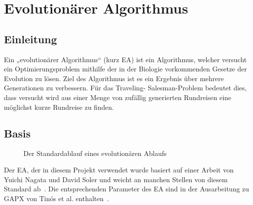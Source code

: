\chapter{Evolutionärer Algorithmus}
\section{Einleitung}
Ein „evolutionärer Algorithmus“ (kurz EA) ist ein Algorithmus, welcher 
versucht ein Optimierungsproblem mithilfe der in der Biologie 
vorkommenden Gesetze der Evolution zu lösen. Ziel des Algorithmus ist es
ein Ergebnis über mehrere Generationen zu verbessern. Für das Traveling-
Salesman-Problem bedeutet dies, dass versucht wird aus einer Menge
von zufällig generierten Rundreisen eine möglichst kurze Rundreise zu
finden.

\section{Basis}

\begin{figure}[H]
\caption[Standardablauf eines evolutionären Algorithmus]{Der
  Standardablauf eines evolutionären Ablaufs}
\end{figure}
Der EA, der in diesem Projekt verwendet wurde basiert auf einer
Arbeit von Yuichi Nagata und David Soler und weicht an manchen
Stellen von diesem Standard ab~\cite{nagata}. Die entsprechenden
Parameter des EA sind in der Ausarbeitung zu GAPX von Tinós et al.
enthalten~\cite{gapx}.

